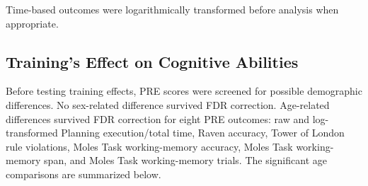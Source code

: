 \documentclass[
  letterpaper,
  DIV=11,
  numbers=noendperiod]{scrartcl}
\begin{document}
Time-based outcomes were logarithmically transformed before analysis
when appropriate.

\subsection{Training's Effect on Cognitive
Abilities}\label{trainings-effect-on-cognitive-abilities}

Before testing training effects, PRE scores were screened for possible
demographic differences. No sex-related difference survived FDR
correction. Age-related differences survived FDR correction for eight
PRE outcomes: raw and log-transformed Planning execution/total time,
Raven accuracy, Tower of London rule violations, Moles Task
working-memory accuracy, Moles Task working-memory span, and Moles Task
working-memory trials. The significant age comparisons are summarized
below.
\end{document}

